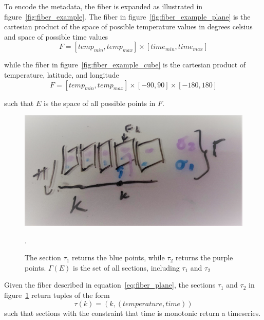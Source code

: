 To encode the metadata, the fiber is expanded as illustrated in figure~\ref{fig:fiber_example}. The fiber in figure~\ref{fig:fiber_example_plane} is the cartesian product of the space of possible temperature values in degrees celsius and space of possible time values
\begin{equation}
F = [temp_{min}, temp_{max}] \times [time_{min}, time_{max}]
\label{eq:fiber_plane}
\end{equation}

while the fiber in figure~\ref{fig:fiber_example_cube} is the cartesian product of temperature, latitude, and longitude
\begin{equation}
F = [temp_{min}, temp_{max}] \times [-90, 90] \times [-180, 180]
\label{eg:fiber_cube}
\end{equation}

such that $E$ is the space of all possible points in $F$.

\begin{figure}[ht!]
    \includegraphics[width=1\linewidth]{figures/math/fiberbundle.png}
    \label{fig:fiber_example_section}
    \caption{The section $\tau_1$ returns the blue points,  while $\tau_2$ returns the purple points. $\Gamma(E)$ is the set of all sections, including $\tau_1$ and $\tau_2$}.  
\end{figure}
Given the fiber described in equation~\ref{eq:fiber_plane}, the sections $\tau_{1}$ and $\tau_{2}$ in figure~\ref{fig:fiber_example_section} return tuples of the form
\begin{equation}
\tau(k) = (k, (temperature, time))
\end{equation}
such that sections with the constraint that time is monotonic return a timeseries. 

